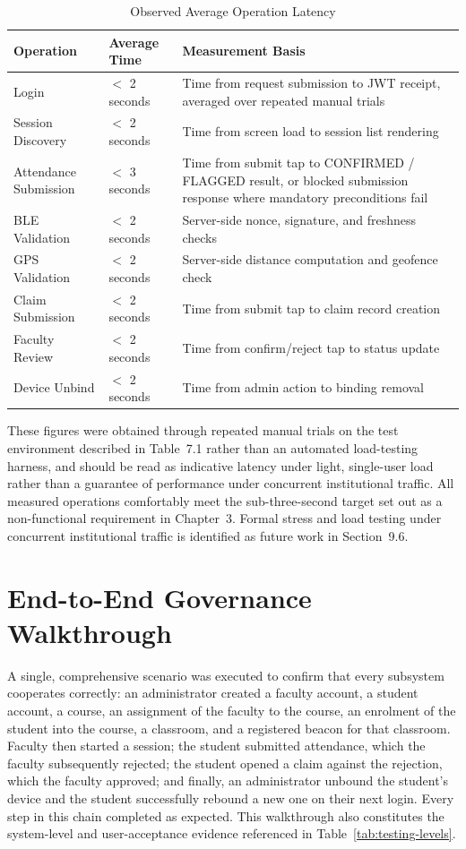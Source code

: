 \documentclass[12pt, a4paper, oneside]{report}
\begin{document}
\begin{table}[htbp]
\centering
\caption{Observed Average Operation Latency}
\label{tab:latency}
\begin{tabularx}{\textwidth}{|l|l|X|}
\hline
\textbf{Operation} & \textbf{Average Time} & \textbf{Measurement Basis} \\
\hline
Login & $<$ 2 seconds & Time from request submission to JWT receipt, averaged over repeated manual trials \\
\hline
Session Discovery & $<$ 2 seconds & Time from screen load to session list rendering \\
\hline
Attendance Submission & $<$ 3 seconds & Time from submit tap to CONFIRMED / FLAGGED result, or blocked submission response where mandatory preconditions fail \\
\hline
BLE Validation & $<$ 2 seconds & Server-side nonce, signature, and freshness checks \\
\hline
GPS Validation & $<$ 2 seconds & Server-side distance computation and geofence check \\
\hline
Claim Submission & $<$ 2 seconds & Time from submit tap to claim record creation \\
\hline
Faculty Review & $<$ 2 seconds & Time from confirm/reject tap to status update \\
\hline
Device Unbind & $<$ 2 seconds & Time from admin action to binding removal \\
\hline
\end{tabularx}
\end{table}

These figures were obtained through repeated manual trials on the test environment described in Table~7.1 rather than an automated load-testing harness, and should be read as indicative latency under light, single-user load rather than a guarantee of performance under concurrent institutional traffic. All measured operations comfortably meet the sub-three-second target set out as a non-functional requirement in Chapter~3. Formal stress and load testing under concurrent institutional traffic is identified as future work in Section~9.6.

\section{End-to-End Governance Walkthrough}

A single, comprehensive scenario was executed to confirm that every subsystem cooperates correctly: an administrator created a faculty account, a student account, a course, an assignment of the faculty to the course, an enrolment of the student into the course, a classroom, and a registered beacon for that classroom. Faculty then started a session; the student submitted attendance, which the faculty subsequently rejected; the student opened a claim against the rejection, which the faculty approved; and finally, an administrator unbound the student's device and the student successfully rebound a new one on their next login. Every step in this chain completed as expected. This walkthrough also constitutes the system-level and user-acceptance evidence referenced in Table~\ref{tab:testing-levels}.
\end{document}
